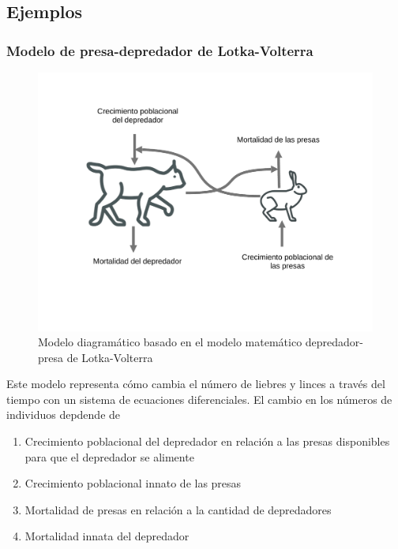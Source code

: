 \documentclass[
]{book}
\providecommand{\tightlist}{%
  \setlength{\itemsep}{0pt}\setlength{\parskip}{0pt}}
\begin{document}
\hypertarget{ejemplos-1}{%
\subsection{Ejemplos}\label{ejemplos-1}}

\hypertarget{modelo-de-presa-depredador-de-lotka-volterra--volterra1928variations}{%
\subsubsection{\texorpdfstring{Modelo de presa-depredador de Lotka-Volterra \citeyearpar{volterra1928variations}}{Modelo de presa-depredador de Lotka-Volterra {[}-@volterra1928variations{]}}}\label{modelo-de-presa-depredador-de-lotka-volterra--volterra1928variations}}

\begin{figure}

{\centering \includegraphics[width=12.18in]{Unidad-I/Volterra/Volterra} 

}

\caption{Modelo diagramático basado en el modelo matemático depredador-presa de Lotka-Volterra}\label{fig:volterra-diag}
\end{figure}

Este modelo representa cómo cambia el número de liebres y linces a través del tiempo con un sistema de ecuaciones diferenciales. El cambio en los números de individuos depdende de

\begin{enumerate}
\def\labelenumi{\arabic{enumi}.}
\tightlist
\item
  Crecimiento poblacional del depredador en relación a las presas disponibles para que el depredador se alimente
\item
  Crecimiento poblacional innato de las presas
\item
  Mortalidad de presas en relación a la cantidad de depredadores
\item
  Mortalidad innata del depredador
\end{enumerate}
\end{document}
